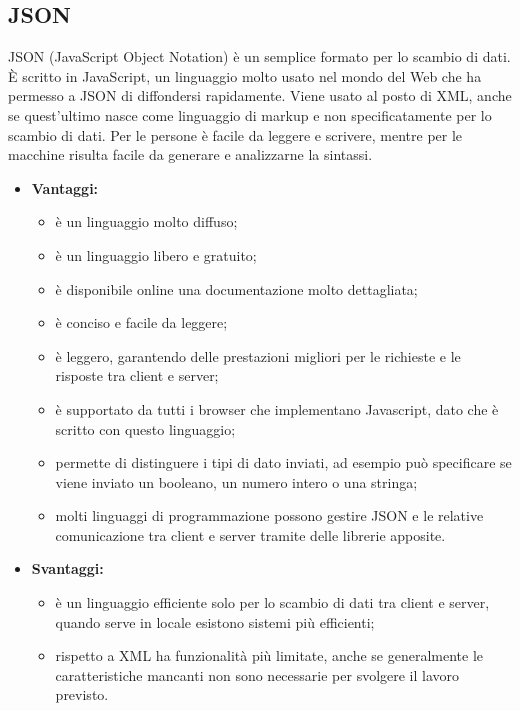 \subsection{JSON}
	JSON (JavaScript Object Notation) è un semplice formato per lo scambio di dati. È scritto in JavaScript, un linguaggio molto usato nel mondo del Web che ha permesso a JSON di diffondersi rapidamente. Viene usato al posto di XML, anche se quest'ultimo nasce come linguaggio di markup e non specificatamente per lo scambio di dati. Per le persone è facile da leggere e scrivere, mentre per le macchine risulta facile da generare e analizzarne la sintassi.
	
	\begin{itemize}
		\item \textbf{Vantaggi:}
			\begin{itemize}
				\item è un linguaggio molto diffuso;
				\item è un linguaggio libero e gratuito;
				\item è disponibile online una documentazione molto dettagliata;
				\item è conciso e facile da leggere;
				\item è leggero, garantendo delle prestazioni migliori per le richieste e le risposte tra client e server;
				\item è supportato da tutti i browser che implementano Javascript, dato che è scritto con questo linguaggio;
				\item permette di distinguere i tipi di dato inviati, ad esempio può specificare se viene inviato un booleano, un numero intero o una stringa;
				\item molti linguaggi di programmazione possono gestire JSON e le relative comunicazione tra client e server tramite delle librerie apposite.
			\end{itemize}
		\item \textbf{Svantaggi:}
			\begin{itemize}
				\item è un linguaggio efficiente solo per lo scambio di dati tra client e server, quando serve in locale esistono sistemi più efficienti;
				\item rispetto a XML ha funzionalità più limitate, anche se generalmente le caratteristiche mancanti non sono necessarie per svolgere il lavoro previsto.
			\end{itemize}
	\end{itemize}

